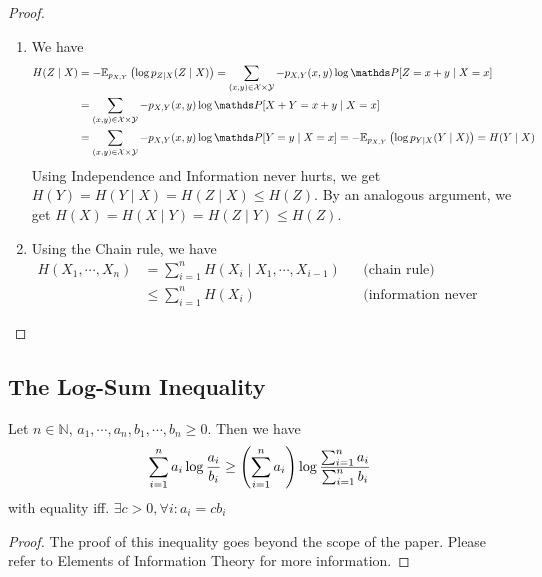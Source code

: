 \begin{proof}
\begin{enumerate}
        \item
            We have
            \begin{align*}
                 H(Z \mid X) &= -\mathbb{E}_{p_{X,Y}}\paren{\log p_{Z \mid X}(Z \mid X)} = \sum_{(x, y) \injoint}{-p_{X,Y}(x, y) \log \prob[Z = x + y \mid X = x]} \\
                 &= \sum_{(x, y) \injoint}{-p_{X,Y}(x, y) \log \prob[X + Y = x + y \mid X = x]} \\
                 &= \sum_{(x, y) \injoint}{-p_{X,Y}(x, y) \log \prob[Y = y \mid X = x]}
                 = -\mathbb{E}_{p_{X,Y}}\paren{\log p_{Y \mid X}(Y \mid X)} = H(Y \mid X)
            \end{align*}
            Using Independence and Information never hurts, we get
            $H(Y) = H(Y \mid X) = H(Z \mid X) \le H(Z)$.
            By an analogous argument, we get
            $H(X) = H(X \mid Y) = H(Z \mid Y) \le H(Z)$.

        \item
            Using the Chain rule, we have
            \begin{align*}
                H(X_1, \cdots, X_n) &= \sum_{i=1}^{n}{H(X_i \mid X_1, \cdots, X_{i-1})}         && \text{(chain rule)} \\
                &\le \sum_{i=1}^{n}{H(X_i)}                                                     && \text{(information never hurts)}
            \end{align*}

    \end{enumerate}
\end{proof}


\subsection{The Log-Sum Inequality}

\begin{theorem}
    Let $n \in \mathbb{N}$, $a_1, \cdots, a_n, b_1, \cdots, b_n \ge 0$.
    Then we have 
    \[
        \sum_{i=1}^{n}{a_i \log\frac{a_i}{b_i}} 
        \ge \left(\sum_{i=1}^{n}{a_i}\right)\log\frac{\sum_{i=1}^{n}{a_i}}{\sum_{i=1}^{n}{b_i}}
    \]
    with equality iff. $\exists c > 0, \forall i: a_i = c b_i$
\end{theorem}
\begin{proof}
    The proof of this inequality goes beyond the scope of the paper. Please refer to Elements of Information Theory \cite{Thomas:ElementsOfInformationTheory} for more information.
\end{proof}


